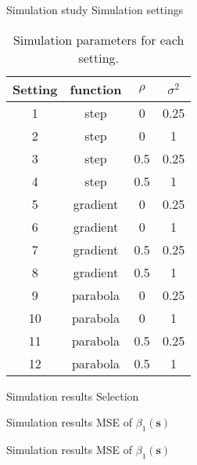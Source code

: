 \documentclass[12pt,t,handout]{beamer}
\newcommand{\subt}[1]{{\footnotesize \color{subtitle} {#1}}}
\begin{document}
\begin{frame}{Simulation study}
\subt{Simulation settings}
    \begin{table}[h!]
        \begin{center}
        \begin{tabular}{cccc}
            \hline
            Setting & function & $\rho$ & $\sigma^2$ \\ 
            \hline
            1 & step & 0 & 0.25 \\ 
            2 & step & 0 & 1 \\ 
            3 & step & 0.5 & 0.25 \\ 
            4 & step & 0.5 & 1 \\ 
            \hline
            5 & gradient & 0 & 0.25 \\ 
            6 & gradient & 0 & 1 \\ 
            7 & gradient & 0.5 & 0.25 \\ 
            8 & gradient & 0.5 & 1 \\ 
            \hline
            9 & parabola & 0 & 0.25 \\ 
            10 & parabola & 0 & 1 \\ 
            11 & parabola & 0.5 & 0.25 \\ 
            12 & parabola & 0.5 & 1 
        \end{tabular}
        \end{center}
        \caption{Simulation parameters for each setting.\label{table:simulation_settings}}
    \end{table}
\note{}
\end{frame}


\begin{frame}{Simulation results}
\subt{Selection}
\hspace{-10mm}
\note{}
\end{frame}


\begin{frame}{Simulation results}
\subt{MSE of $\beta_1(\bm{s})$}

\note{}
\end{frame}


\begin{frame}{Simulation results}
\subt{MSE of $\beta_1(\bm{s})$}

\note{}
\end{frame}
\end{document}
